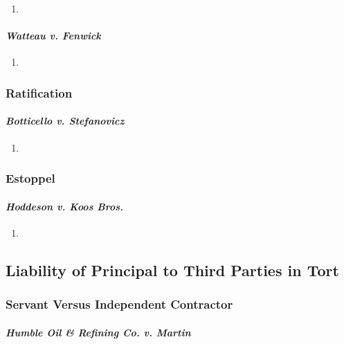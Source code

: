 \begin{enumerate}
    \item %
\end{enumerate}

\paragraph{\emph{Watteau v. Fenwick}}

\begin{enumerate}
    \item %
\end{enumerate}

\subsubsection{Ratification}

\paragraph{\emph{Botticello v. Stefanovicz}}

\begin{enumerate}
    \item %
\end{enumerate}

\subsubsection{Estoppel}

\paragraph{\emph{Hoddeson v. Koos Bros.}}

\begin{enumerate}
    \item %
\end{enumerate}

\subsection{Liability of Principal to Third Parties in Tort}

\subsubsection{Servant Versus Independent Contractor}

\paragraph{\emph{Humble Oil \& Refining Co. v. Martin}}

